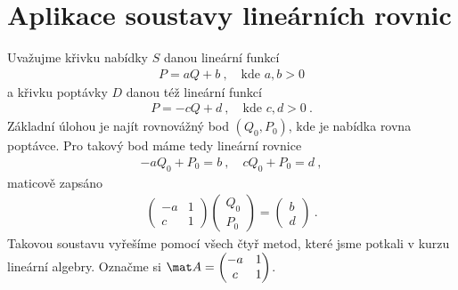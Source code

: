\section*{Aplikace soustavy lineárních rovnic}

\begin{example}
    Uvažujme křivku nabídky $S$ danou lineární funkcí \begin{align}
        P = aQ + b \:, \quad \text{kde } a,b>0
    \end{align}
    a křivku poptávky $D$ danou též lineární funkcí \begin{align}
        P = -cQ + d \:, \quad \text{kde } c,d>0 \:.
    \end{align}
    Základní úlohou je najít rovnovážný bod $(Q_0,P_0)$, kde je nabídka rovna poptávce.
    Pro takový bod máme tedy lineární rovnice
    \begin{align}
        -aQ_0 + P_0 = b \:, \quad cQ_0 + P_0 = d\:,
    \end{align} 
    maticově zapsáno
    \begin{align}
        \begin{pmatrix}
            -a & 1 \\ c & 1
        \end{pmatrix}
        \begin{pmatrix}
            Q_0 \\ P_0
        \end{pmatrix}
        =
        \begin{pmatrix}
            b \\ d
        \end{pmatrix} \:.
    \end{align}
    Takovou soustavu vyřešíme pomocí všech čtyř metod, které jsme potkali v kurzu lineární algebry. Označme si $\mat A = \begin{pmatrix}
        -a & 1 \\ c & 1
    \end{pmatrix}$.


\end{example}
